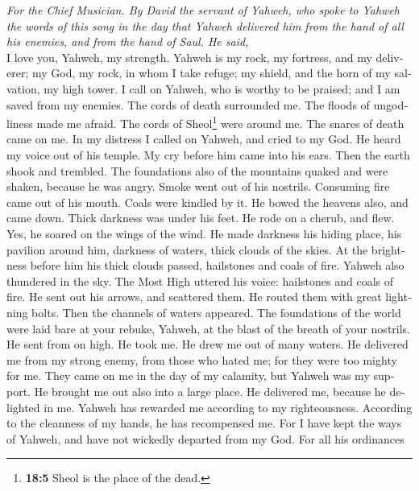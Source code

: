\begin{paracol}{2}
\begin{otherlanguage}{english}
\emph{For the Chief Musician. By David the servant of Yahweh, who spoke
to Yahweh the words of this song in the day that Yahweh delivered him
from the hand of all his enemies, and from the hand of Saul. He said,}\\
 I love you, Yahweh, my strength.  Yahweh is
my rock, my fortress, and my deliverer; my God, my rock, in whom I take
refuge; my shield, and the horn of my salvation, my high tower.
 I call on Yahweh, who is worthy to be praised; and I am
saved from my enemies.  The cords of death surrounded me.
The floods of ungodliness made me afraid.  The cords of
Sheol\footnote{\textbf{18:5} Sheol is the place of the dead.} were
around me. The snares of death came on me.  In my distress
I called on Yahweh, and cried to my God. He heard my voice out of his
temple. My cry before him came into his ears.  Then the
earth shook and trembled. The foundations also of the mountains quaked
and were shaken, because he was angry.  Smoke went out of
his nostrils. Consuming fire came out of his mouth. Coals were kindled
by it.  He bowed the heavens also, and came down. Thick
darkness was under his feet.  He rode on a cherub, and
flew. Yes, he soared on the wings of the wind.  He made
darkness his hiding place, his pavilion around him, darkness of waters,
thick clouds of the skies.  At the brightness before him
his thick clouds passed, hailstones and coals of fire. 
Yahweh also thundered in the sky. The Most High uttered his voice:
hailstones and coals of fire.  He sent out his arrows,
and scattered them. He routed them with great lightning bolts.
 Then the channels of waters appeared. The foundations of
the world were laid bare at your rebuke, Yahweh, at the blast of the
breath of your nostrils.  He sent from on high. He took
me. He drew me out of many waters.  He delivered me from
my strong enemy, from those who hated me; for they were too mighty for
me.  They came on me in the day of my calamity, but
Yahweh was my support.  He brought me out also into a
large place. He delivered me, because he delighted in me.
 Yahweh has rewarded me according to my righteousness.
According to the cleanness of my hands, he has recompensed me.
 For I have kept the ways of Yahweh, and have not
wickedly departed from my God.  For all his ordinances

\end{otherlanguage}
\end{paracol}
